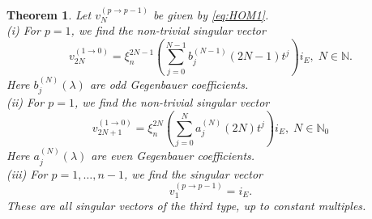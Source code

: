 \documentclass[a4paper,12pt,reqno]{amsart}
\newtheorem{theorem}{Theorem}
\numberwithin{theorem}{subsection}
\numberwithin{equation}{section}
\begin{document}
\begin{theorem}\label{sv-third} Let $v^{(p\to p-1)}_{N}$ be given by \eqref{eq:HOM1}. \\
(i) For $p=1$, we find the non-trivial singular vector
\begin{equation}\label{sv-type-3-even}
   v_{2N}^{(1\to 0)} = \xi_n^{2N-1} \left(\sum_{j=0}^{N-1} b_j^{(N-1)}(2N\!-\!1) t^j \right)
   i_E,\; N \in {\mathbb{N}}.
\end{equation}
Here $b_j^{(N)}(\lambda)$ are odd Gegenbauer coefficients. \\
(ii) For $p=1$, we find the non-trivial singular vector
\begin{equation}\label{sv-type-3-odd}
   v_{2N+1}^{(1\to 0)} = \xi_n^{2N} \left(\sum_{j=0}^N a_j^{(N)}(2N) t^j\right)
   i_E, \; N \in {\mathbb{N}}_0
\end{equation}
Here $a_j^{(N)}(\lambda)$ are even Gegenbauer coefficients. \\
(iii) For $p=1,\dots,n-1$, we find the singular vector
\begin{equation}\label{sv-type-3-1}
   v_{1}^{(p\to p-1)} = i_E.
\end{equation}
These are all singular vectors of the third type, up to constant multiples.
\end{theorem}
\end{document}
